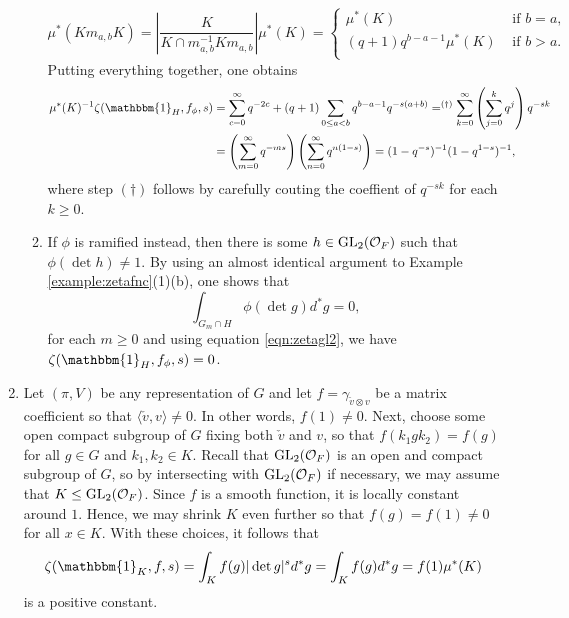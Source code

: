 \begin{example}
\begin{enumerate}[(1)]
\begin{enumerate}
            \[
            \mu^*(Km_{a,b}K)=\left|\frac{K}{K\cap m_{a,b}^{-1}K m_{a,b}}\right|\mu^*(K)=
            \begin{cases}
                \mu^*(K) &\text{ if } b=a,\\
                (q+1)q^{b-a-1}\mu^*(K) &\text{ if } b > a.\\
            \end{cases}
            \]
            Putting everything together, one obtains
            \begin{align*}
                \mu^*(K)^{-1}\zeta(\mathbbm{1}_H,f_\phi,s)&=\sum_{c=0}^{\infty}q^{-2c}+(q+1)\sum_{0\leq a< b}q^{b-a-1}q^{-s(a+b)}=^{(\dagger)}\sum_{k=0}^\infty\left(\sum_{j=0}^k q^j\right)q^{-sk}\\
                &=\left(\sum_{m=0}^\infty q^{-ms}\right)\left(\sum_{n=0}^\infty q^{n(1-s)}\right)=(1-q^{-s})^{-1}(1-q^{1-s})^{-1},
            \end{align*}
            where step $(\dagger)$ follows by carefully couting the coeffient of $q^{-sk}$ for each $k\geq 0$.
            \item If $\phi$ is ramified instead, then there is some $h\in \mathrm{GL}_2(\mathcal{O}_F)$ such that $\phi(\det h)\neq 1$. By using an almost identical argument to Example \ref{example:zetafnc}(1)(b), one shows that
            $$\int_{G_m\cap H}\phi(\det g)d^*g=0,$$
            for each $m\geq 0$ and using equation \eqref{eqn:zetagl2}, we have $\zeta(\mathbbm{1}_H,f_\phi,s)=0$.
        \end{enumerate} 
        
        \item Let $(\pi,V)$ be any representation of $G$ and let $f=\gamma_{\check{v}\otimes v}$ be a matrix coefficient so that $\langle\check{v},v\rangle\neq 0$. In other words, $f(1)\neq 0$. Next, choose some open compact subgroup of $G$ fixing both $\check{v}$ and $v$, so that $f(k_1gk_2)=f(g)$ for all $g\in G$ and $k_1,k_2\in K$. Recall that $\mathrm{GL}_2(\mathcal{O}_F)$ is an open and compact subgroup of $G$, so by intersecting with $\mathrm{GL}_2(\mathcal{O}_F)$ if necessary, we may assume that $K\leq\mathrm{GL}_2(\mathcal{O}_F)$. Since $f$ is a smooth function, it is locally constant around $1$. Hence, we may shrink $K$ even further so that $f(g)=f(1)\neq0$ for all $x\in K$. With these choices, it follows that 
        $$\zeta(\mathbbm{1}_K,f,s)=\int_{K}f(g)|\det g|^sd^*g=\int_K f(g)d^*g=f(1)\mu^*(K)$$ is a positive constant.
        

    \end{enumerate}
\end{example}

